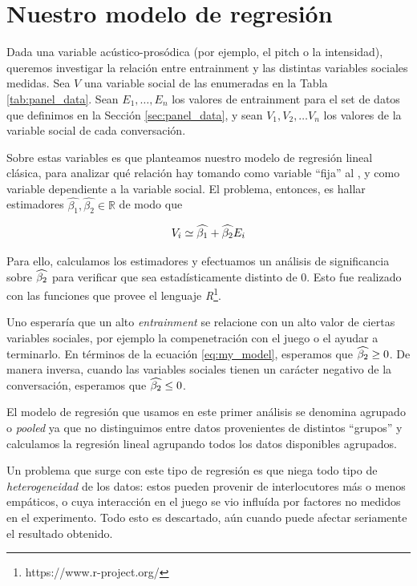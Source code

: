 \section{Nuestro modelo de regresión}

Dada una variable acústico-prosódica (por ejemplo, el pitch o la intensidad), queremos investigar la relación entre entrainment y las distintas variables sociales medidas. Sea $V$ una variable social de las enumeradas en la Tabla \ref{tab:panel_data}. Sean $E_1, \ldots, E_n$ los valores de entrainment para el set de datos que definimos en la Sección \ref{sec:panel_data}, y sean $V_1, V_2, \ldots V_n$ los valores de la variable social de cada conversación.

Sobre estas variables es que planteamos nuestro modelo de regresión lineal clásica, para analizar qué relación hay tomando como variable ``fija'' al \entrainment, y como variable dependiente a la variable social. El problema, entonces, es hallar estimadores $\widehat{\beta_1}, \widehat{\beta_2} \in \mathbb{R}$ de modo que

\begin{equation}
  V_i \simeq \widehat{\beta_1} + \widehat{\beta_2} E_i
  \label{eq:my_model}
\end{equation}


Para ello, calculamos los estimadores y efectuamos un análisis de significancia sobre $\widehat{\beta_2}$ para verificar que sea estadísticamente distinto de 0. Esto fue realizado con las funciones que provee el lenguaje \emph{R}\footnote{https://www.r-project.org/}.

Uno esperaría que un alto \emph{entrainment} se relacione con un alto valor de ciertas variables sociales, por ejemplo la compenetración con el juego o el ayudar a terminarlo. En términos de la ecuación \ref{eq:my_model}, esperamos que $\widehat{\beta_2} \geq 0$. De manera inversa, cuando las variables sociales tienen un carácter negativo de la conversación, esperamos que $\widehat{\beta_2} \leq 0$.


El modelo de regresión que usamos en este primer análisis se denomina agrupado o \emph{pooled} ya que no distinguimos entre datos provenientes de distintos ``grupos'' \cite{gujarati1999} y calculamos la regresión lineal agrupando todos los datos disponibles agrupados.

Un problema que surge con este tipo de regresión es que niega todo tipo de \emph{heterogeneidad} de los datos: estos pueden provenir de interlocutores más o menos empáticos, o cuya interacción en el juego se vio influída por factores no medidos en el experimento. Todo esto es descartado, aún cuando puede afectar seriamente  el resultado obtenido.

